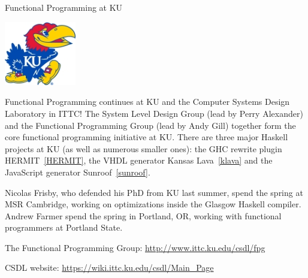 \begin{hcarentry}{Functional Programming at KU}
\label{ukansas}
\makeheader

\begin{center}
\includegraphics[width=0.235\textwidth]{html/jh2.jpg}
\end{center}

Functional Programming continues at KU and
the Computer Systems Design Laboratory in ITTC!
The System Level Design Group (lead by Perry Alexander)
and the Functional Programming Group (lead by Andy Gill)
together form the core functional programming initiative at KU.
There are three major Haskell projects at KU (as
well as numerous smaller ones):
the GHC rewrite plugin HERMIT~\cref{HERMIT},
the VHDL generator Kansas Lava~\cref{klava} and
the JavaScript generator Sunroof~\cref{sunroof}.

Nicolas Frisby, who defended his PhD from KU last summer,
spend the spring at MSR Cambridge, working on optimizations
inside the Glasgow Haskell compiler.
Andrew Farmer spend the spring in Portland, OR, working
with functional programmers at Portland State.

\FurtherReading
\begin{compactitem}
\item   The Functional Programming Group:
    \url{http://www.ittc.ku.edu/csdl/fpg}
\item
  CSDL website: \url{https://wiki.ittc.ku.edu/csdl/Main_Page}
\end{compactitem}
\end{hcarentry}
